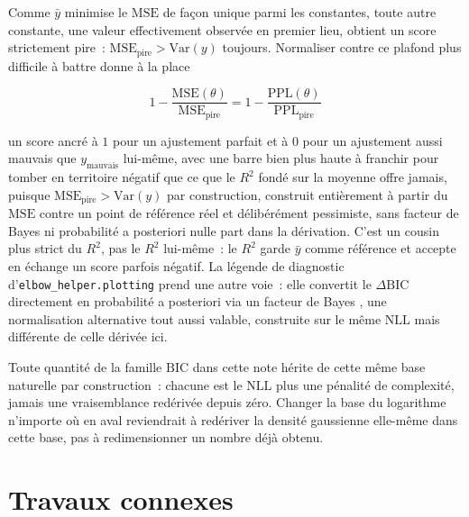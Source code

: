 \documentclass[11pt]{article}
\newcommand{\code}[1]{\texttt{#1}}
\begin{document}
Comme $\bar y$ minimise le $\mathrm{MSE}$ de façon unique parmi les
constantes, toute autre constante, une valeur effectivement observée en
premier lieu, obtient un score strictement pire~: $\mathrm{MSE}_{\text{pire}}
> \mathrm{Var}(y)$ toujours. Normaliser contre ce plafond plus difficile à
battre donne à la place

\begin{equation}
1 - \frac{\mathrm{MSE}(\theta)}{\mathrm{MSE}_{\text{pire}}} = 1 - \frac{\mathrm{PPL}(\theta)}{\mathrm{PPL}_{\text{pire}}}
\end{equation}

un score ancré à $1$ pour un ajustement parfait et à $0$ pour un
ajustement aussi mauvais que $y_{\text{mauvais}}$ lui-même, avec une
barre bien plus haute à franchir pour tomber en territoire négatif que ce
que le $R^2$ fondé sur la moyenne offre jamais, puisque
$\mathrm{MSE}_{\text{pire}} > \mathrm{Var}(y)$ par construction, construit
entièrement à partir du $\mathrm{MSE}$ contre un point de référence réel
et délibérément pessimiste, sans facteur de Bayes ni probabilité a
posteriori nulle part dans la dérivation. C'est un cousin plus strict du
$R^2$, pas le $R^2$ lui-même~: le $R^2$ garde $\bar y$ comme référence et
accepte en échange un score parfois négatif. La légende de diagnostic
d'\code{elbow\_helper.plotting} prend une autre voie~: elle convertit le
$\Delta\mathrm{BIC}$ directement en probabilité a posteriori via un
facteur de Bayes \citep{kassraftery1995}, une normalisation alternative
tout aussi valable, construite sur le même $\mathrm{NLL}$ mais différente
de celle dérivée ici.

Toute quantité de la famille $\mathrm{BIC}$ dans cette note hérite de
cette même base naturelle par construction~: chacune est le
$\mathrm{NLL}$ plus une pénalité de complexité, jamais une vraisemblance
redérivée depuis zéro. Changer la base du logarithme n'importe où en aval
reviendrait à redériver la densité gaussienne elle-même dans cette base,
pas à redimensionner un nombre déjà obtenu.

\section{Travaux connexes}
\label{sec:related-work}
\end{document}
